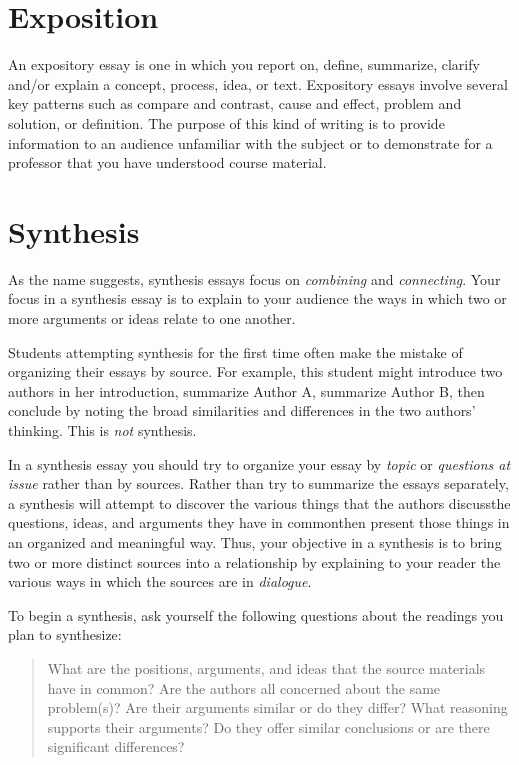 \section{Exposition} An expository essay is one in which you report on, define,
summarize, clarify and/or explain a concept, process, idea, or text. Expository
essays involve several key patterns such as compare and contrast, cause and
effect, problem and solution, or definition. The purpose of this kind of
writing is to provide information to an audience unfamiliar with the subject or
to demonstrate for a professor that you have understood course material.

\hypertarget{synthesisessay}{} \section{Synthesis}

As the name suggests, synthesis essays focus on \emph{combining} and
\emph{connecting}. Your focus in a synthesis essay is to explain to your
audience the ways in which two or more arguments or ideas relate to one another.

Students attempting synthesis for the first time often make the mistake of
organizing their essays by source. For example, this student might introduce two
authors in her introduction, summarize Author A, summarize Author B, then
conclude by noting the broad similarities and differences in the two authors'
thinking. This is \emph{not} synthesis.

In a synthesis essay you should try to organize your essay by \emph{topic} or
\emph{questions at issue} rather than by sources. Rather than try to summarize
the essays separately, a synthesis will attempt to discover the various things
that the authors discuss\textemdash the questions, ideas, and arguments they
have in common\textemdash then present those things in an organized and
meaningful way. Thus, your objective in a synthesis is to bring two or more
distinct sources into a relationship by explaining to your reader the various
ways in which the sources are in \emph{dialogue}.

To begin a synthesis, ask yourself the following questions about the readings
you plan to synthesize: \begin{quote} What are the positions, arguments, and
ideas that the source materials have in common? Are the authors all concerned
about the same problem(s)?  Are their arguments similar or do they differ? What
reasoning supports their arguments? Do they offer similar conclusions or are
there significant differences? \end{quote}

